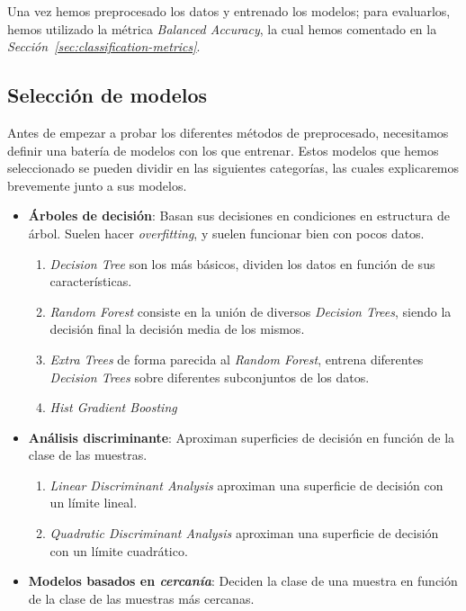 Una vez hemos preprocesado los datos y entrenado los modelos; para evaluarlos, hemos utilizado la métrica \textit{Balanced Accuracy}, la cual hemos comentado en la \textit{Sección\ \ref{sec:classification-metrics}}.

\subsection{Selección de modelos}

Antes de empezar a probar los diferentes métodos de preprocesado, necesitamos definir una batería de modelos con los que entrenar. Estos modelos que hemos seleccionado se pueden dividir en las siguientes categorías, las cuales explicaremos brevemente junto a sus modelos.

\begin{itemize}
    \item \textbf{Árboles de decisión}: Basan sus decisiones en condiciones en estructura de árbol. Suelen hacer \textit{overfitting}, y suelen funcionar bien con pocos datos.
    \begin{enumerate}
        \item \textit{Decision Tree} son los más básicos, dividen los datos en función de sus características.
        \item \textit{Random Forest} consiste en la unión de diversos \textit{Decision Trees}, siendo la decisión final la decisión media de los mismos.
        \item \textit{Extra Trees} de forma parecida al \textit{Random Forest}, entrena diferentes \textit{Decision Trees} sobre diferentes subconjuntos de los datos.
        \item \textit{Hist Gradient Boosting}
    \end{enumerate}
         \item \textbf{Análisis discriminante}: Aproximan superficies de decisión en función de la clase de las muestras.
        \begin{enumerate}
            \item \textit{Linear Discriminant Analysis} aproximan una superficie de decisión con un límite lineal.
            \item \textit{Quadratic Discriminant Analysis} aproximan una superficie de decisión con un límite cuadrático.
        \end{enumerate}
    \item \textbf{Modelos basados en \textit{cercanía}}: Deciden la clase de una muestra en función de la clase de las muestras más cercanas.

\end{itemize}
